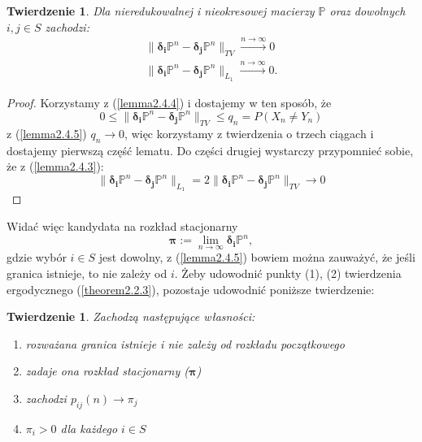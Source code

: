\documentclass[a4paper]{article}
\theoremstyle{defn}
\theoremstyle{theorem}
\newtheorem{theorem}[defn]{Twierdzenie}
\theoremstyle{lemma}
\theoremstyle{cor}
\theoremstyle{fact}
\begin{document}
\begin{theorem}\label{theorem2.4.6}
Dla nieredukowalnej i nieokresowej macierzy $\mathbb{P}$ oraz dowolnych $i, j \in S$ zachodzi:
\begin{align*}
\|\boldsymbol{\delta_i}\mathbb{P}^n - \boldsymbol{\delta_j}\mathbb{P}^n\|_{TV} \xrightarrow{n \to \infty} 0 \\ 
\|\boldsymbol{\delta_i}\mathbb{P}^n - \boldsymbol{\delta_j}\mathbb{P}^n\|_{L_1} \xrightarrow{n \to \infty} 0.
\end{align*}
\end{theorem}
\begin{proof}
Korzystamy z (\ref{lemma2.4.4}) i dostajemy w ten sposób, że $$0 \leq \|\boldsymbol{\delta_i}\mathbb{P}^n - \boldsymbol{\delta_j}\mathbb{P}^n\|_{TV} \leq q_n = P(X_n \neq Y_n)$$
z (\ref{lemma2.4.5}) $q_n \to 0$, więc korzystamy z twierdzenia o trzech ciągach i dostajemy pierwszą część lematu. Do części drugiej wystarczy przypomnieć sobie, że z (\ref{lemma2.4.3}):  $$\|\boldsymbol{\delta_i}\mathbb{P}^n - \boldsymbol{\delta_j}\mathbb{P}^n\|_{L_1} = 2\|\boldsymbol{\delta_i}\mathbb{P}^n - \boldsymbol{\delta_j}\mathbb{P}^n\|_{TV} \to 0$$
\end{proof}
Widać więc kandydata na rozkład stacjonarny $$\boldsymbol{\pi} := \lim\limits_{n \to \infty} \boldsymbol{\delta_i}\mathbb{P}^n,$$ gdzie wybór $i \in S$ jest dowolny, z (\ref{lemma2.4.5}) bowiem można zauważyć, że jeśli granica istnieje, to nie zależy od $i$. Żeby udowodnić punkty (1), (2) twierdzenia ergodycznego (\ref{theorem2.2.3}), pozostaje udowodnić poniższe twierdzenie:
\begin{theorem}\label{theorem2.4.7}
Zachodzą następujące własności:
\begin{enumerate}
	\item[(a)] rozważana granica istnieje i nie zależy od rozkładu początkowego
	\item[(b)] zadaje ona rozkład stacjonarny ($\boldsymbol{\pi}$)
	\item[(c)] zachodzi $p_{ij}(n) \to \pi_j$
	\item[(d)] $\pi_i > 0$ dla każdego $i \in S$ 
\end{enumerate}
\end{theorem}
\end{document}
